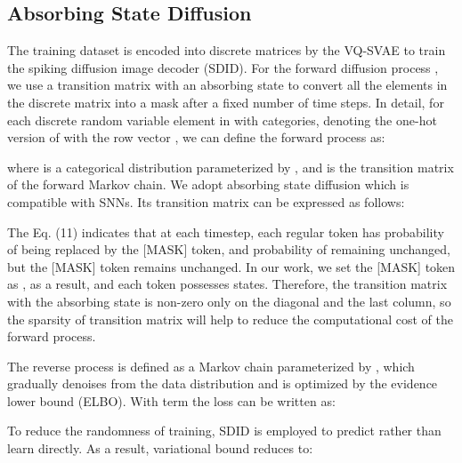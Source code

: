\documentclass{article}
\begin{document}
\subsection{Absorbing State Diffusion}
The training dataset is encoded into discrete matrices  by the VQ-SVAE to train the spiking diffusion image decoder (SDID). For the forward diffusion process , we use a transition matrix with an absorbing state \cite{b30} to convert all the elements in the discrete matrix into a mask after a fixed number of  time steps. In detail, for each discrete random variable element  in  with  categories, denoting the one-hot version of  with the row vector , we can define the forward process as: 

where  is a categorical distribution parameterized by , and  is the transition matrix of the forward Markov chain. We adopt absorbing state diffusion which is compatible with SNNs. Its transition matrix   can be expressed as follows:


The Eq. (11) indicates that at each timestep, each regular token has probability  of being replaced by the [MASK] token, and probability  of remaining unchanged, but the [MASK] token remains unchanged. In our work, we set the [MASK] token as , as a result,  and each token possesses  states.  Therefore, the transition matrix with the absorbing state is non-zero only on the diagonal and the last column, so the sparsity of transition matrix will help to reduce the computational cost of the forward process.

The reverse process is defined as a Markov chain parameterized by , which gradually denoises from the data distribution 
 and is optimized by the evidence lower bound (ELBO). With  term the loss can be written as:


To reduce the randomness of training, SDID  is employed to predict  rather than learn  directly. As a result, variational bound reduces to:  
\end{document}
